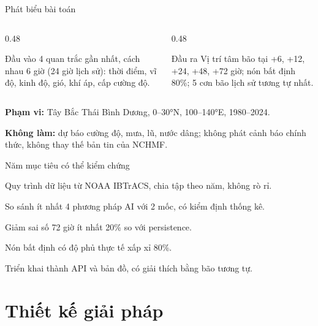 \documentclass[aspectratio=169, 11pt, xcolor={table}]{beamer}
\begin{document}
\begin{frame}{Phát biểu bài toán}
  \begin{columns}[T]
    \begin{column}{0.48\textwidth}
      \begin{block}{Đầu vào}
        4 quan trắc gần nhất, cách nhau 6 giờ (24 giờ lịch sử): thời điểm,
        vĩ độ, kinh độ, gió, khí áp, cấp cường độ.
      \end{block}
    \end{column}
    \begin{column}{0.48\textwidth}
      \begin{block}{Đầu ra}
        Vị trí tâm bão tại +6, +12, +24, +48, +72 giờ; nón bất định 80\%;
        5 cơn bão lịch sử tương tự nhất.
      \end{block}
    \end{column}
  \end{columns}
  \vspace{0.8em}
  \textbf{Phạm vi:} Tây Bắc Thái Bình Dương, 0--30°N, 100--140°E, 1980--2024.

  \textbf{Không làm:} dự báo cường độ, mưa, lũ, nước dâng; không phát cảnh báo
  chính thức, không thay thế bản tin của NCHMF.
\end{frame}

\begin{frame}{Năm mục tiêu có thể kiểm chứng}
  \begin{description}[MT5]
    \item[MT1] Quy trình dữ liệu từ NOAA IBTrACS, chia tập theo năm, không rò rỉ.
    \item[MT2] So sánh ít nhất 4 phương pháp AI với 2 mốc, có kiểm định thống kê.
    \item[MT3] Giảm sai số 72 giờ ít nhất 20\% so với persistence.
    \item[MT4] Nón bất định có độ phủ thực tế xấp xỉ 80\%.
    \item[MT5] Triển khai thành API và bản đồ, có giải thích bằng bão tương tự.
  \end{description}
\end{frame}

\section{Thiết kế giải pháp}
\end{document}
